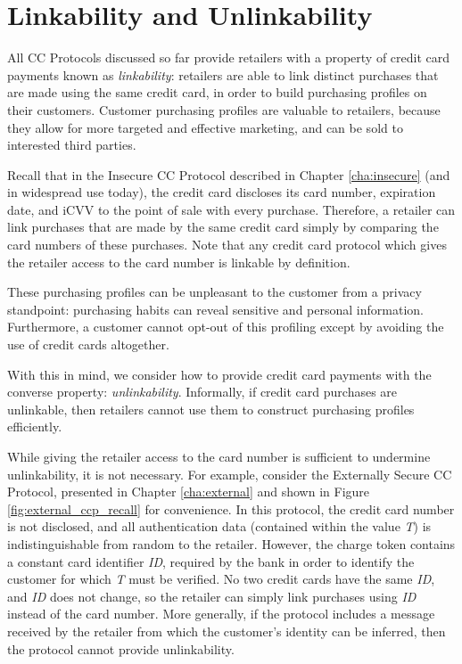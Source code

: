 \section{Linkability and Unlinkability}
\label{sec:unlinkability}

All CC Protocols discussed so far provide retailers with a property of credit card payments known as \emph{linkability}:
    retailers are able to link distinct purchases that are made using the same credit card, in order to build purchasing profiles on their customers.
Customer purchasing profiles are valuable to retailers, because they allow for more targeted and effective marketing, and can be sold to interested third parties.

Recall that in the Insecure CC Protocol described in Chapter \ref{cha:insecure} (and in widespread use today),
  the credit card discloses its card number, expiration date, and iCVV to the point of sale with every purchase.
Therefore, a retailer can link purchases that are made by the same credit card simply by comparing the card numbers of these purchases.
Note that any credit card protocol which gives the retailer access to the card number is linkable by definition.

These purchasing profiles can be unpleasant to the customer from a privacy standpoint:
  purchasing habits can reveal sensitive and personal information.
Furthermore, a customer cannot opt-out of this profiling except by avoiding the use of credit cards altogether.

With this in mind, we consider how to provide credit card payments with the converse property: \emph{unlinkability}.
Informally, if credit card purchases are unlinkable, then retailers cannot use them to construct purchasing profiles efficiently.

While giving the retailer access to the card number is sufficient to undermine unlinkability, it is not necessary.
For example, consider the Externally Secure CC Protocol, presented in Chapter \ref{cha:external} and shown in Figure \ref{fig:external_ccp_recall} for convenience.
In this protocol, the credit card number is not disclosed, and all authentication data (contained within the value \emph{T}) is indistinguishable from random to the retailer.
However, the charge token contains a constant card identifier \emph{ID}, required by the bank in order to identify the customer for which \emph{T} must be verified.
No two credit cards have the same \emph{ID}, and \emph{ID} does not change, so the retailer can simply link purchases using \emph{ID} instead of the card number.
More generally, if the protocol includes a message received by the retailer from which the customer's identity can be inferred, then the protocol cannot provide unlinkability.

